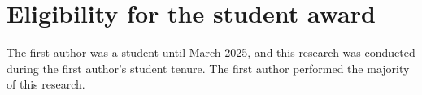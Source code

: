\documentclass[runningheads]{llncs}
\theoremstyle{plain}
\theoremstyle{definition}
\begin{document}
\begin{comment}
\begin{figure}
\texttt{[image: fig1.eps]}
\caption{A figure caption is always placed below the illustration.
Please note that short captions are centered, while long ones are
justified by the macro package automatically.} \label{fig1}
\end{figure}

\begin{theorem}
This is a sample theorem. The run-in heading is set in bold, while
the following text appears in italics. Definitions, lemmas,
propositions, and corollaries are styled the same way.
\end{theorem}
%
%
\begin{proof}
Proofs, examples, and remarks have the initial word in italics,
while the following text appears in normal font.
\end{proof}
For citations of references, we prefer the use of square brackets
and consecutive numbers. Citations using labels or the author/year
convention are also acceptable. The following bibliography provides
a sample reference list with entries for journal
articles~\cite{ref_article1}, an LNCS chapter~\cite{ref_lncs1}, a
book~\cite{ref_book1}, proceedings without editors~\cite{ref_proc1},
and a homepage~\cite{ref_url1}. Multiple citations are grouped
\cite{ref_article1,ref_lncs1,ref_book1},
\cite{ref_article1,ref_book1,ref_proc1,ref_url1}.

\begin{credits}
\subsubsection{\ackname} A bold run-in heading in small font size at the end of the paper is
used for general acknowledgments, for example: This study was funded
by X (grant number Y).

\subsubsection{\discintname}
It is now necessary to declare any competing interests or to specifically
state that the authors have no competing interests. Please place the
statement with a bold run-in heading in small font size beneath the
(optional) acknowledgments\footnote{If EquinOCS, our proceedings submission
system, is used, then the disclaimer can be provided directly in the system.},
for example: The authors have no competing interests to declare that are
relevant to the content of this article. Or: Author A has received research
grants from Company W. Author B has received a speaker honorarium from
Company X and owns stock in Company Y. Author C is a member of committee Z.
\end{credits}

\end{comment}

\section{Eligibility for the student award}

The first author was a student until March 2025, and this research was conducted during the first author's student tenure. The first author performed the majority of this research.
\end{document}
